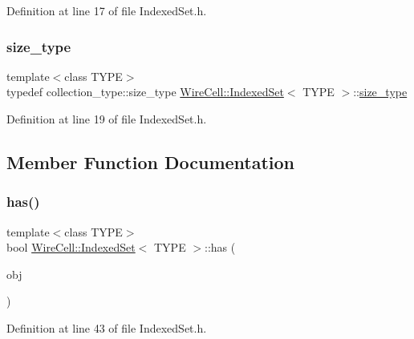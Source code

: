 Definition at line 17 of file Indexed\+Set.\+h.

\mbox{\label{class_wire_cell_1_1_indexed_set_a0b1e1cffb974f20a89cd9d7cd744d89c}} 
\subsubsection{\texorpdfstring{size\+\_\+type}{size\_type}}
{\footnotesize\ttfamily template$<$class T\+Y\+PE$>$ \\
typedef collection\+\_\+type\+::size\+\_\+type \hyperlink{class_wire_cell_1_1_indexed_set}{Wire\+Cell\+::\+Indexed\+Set}$<$ T\+Y\+PE $>$\+::\hyperlink{class_wire_cell_1_1_indexed_set_a0b1e1cffb974f20a89cd9d7cd744d89c}{size\+\_\+type}}



Definition at line 19 of file Indexed\+Set.\+h.



\subsection{Member Function Documentation}
\mbox{\label{class_wire_cell_1_1_indexed_set_af735cbbadbec12f2729387d200320755}} 
\subsubsection{\texorpdfstring{has()}{has()}}
{\footnotesize\ttfamily template$<$class T\+Y\+PE$>$ \\
bool \hyperlink{class_wire_cell_1_1_indexed_set}{Wire\+Cell\+::\+Indexed\+Set}$<$ T\+Y\+PE $>$\+::has (\begin{DoxyParamCaption}\item[{const T\+Y\+PE \&}]{obj }\end{DoxyParamCaption})\hspace{0.3cm}{\ttfamily [inline]}}



Definition at line 43 of file Indexed\+Set.\+h.

\mbox{\label{class_wire_cell_1_1_indexed_set_a67b3d17311b46ca4106bf2966e36e239}} 
